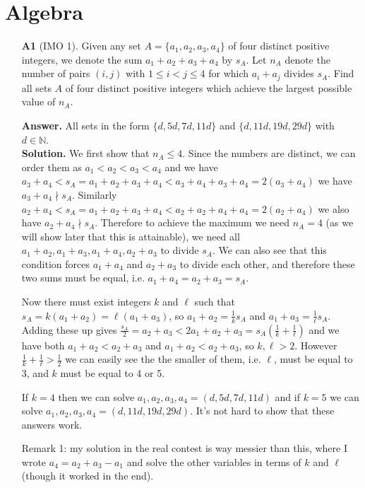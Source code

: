 \documentclass[11pt,a4paper]{article}
\begin{document}
\newcommand{\la}{\leftarrow}
\newcommand{\lra}{\leftrightarrow}
\newcommand{\bbN}{\mathbb{N}}
\newcommand{\dsum}{\displaystyle\sum}
\newcommand{\dprod}{\displaystyle\prod}

\newtheorem{lemma}{Lemma}


\section*{Algebra}
\begin{enumerate}
	\item [\textbf{A1}] (IMO 1). Given any set $A = \{a_1, a_2, a_3, a_4\}$ of four distinct positive integers, we denote the sum $a_1 +a_2 +a_3 +a_4$ by $s_A$. Let $n_A$ denote the number of pairs $(i, j)$ with $1 \leq  i < j \leq 4$ for which $a_i +a_j$ divides $s_A$. Find all sets $A$ of four distinct positive integers which achieve the largest possible value of $n_A$.
	
	\textbf{Answer.} All sets in the form $\{d, 5d, 7d, 11d\}$ and $\{d, 11d, 19d, 29d\}$ with $d\in\bbN$. \\
	\textbf{Solution.} We first show that $n_A\le 4$. Since the numbers are distinct, we can order them as $a_1<a_2<a_3<a_4$ and we have $a_3+a_4<s_A=a_1+a_2+a_3+a_4<a_3+a_4+a_3+a_4=2(a_3+a_4)$ we have $a_3+a_4\nmid s_A$. Similarly $a_2+a_4<s_A=a_1+a_2+a_3+a_4<a_2+a_2+a_4+a_4=2(a_2+a_4)$ we also have $a_2+a_4\nmid s_A$. 
	Therefore to achieve the maximum we need $n_A=4$ (as we will show later that this is attainable), we need all $a_1+a_2, a_1+a_3, a_1+a_4, a_2+a_3$ to divide $s_A$. We can also see that this condition forces $a_1+a_4$ and $a_2+a_3$ to divide each other, and therefore these two sums must be equal, i.e. $a_1+a_4=a_2+a_3=s_A$. 
	
	Now there must exist integers $k$ and $\ell$ such that $s_A=k(a_1+a_2)=\ell(a_1+a_3)$, so $a_1+a_2=\frac 1k s_A$ and $a_1+a_3=\frac 1{\ell} s_A$. Adding these up gives $\frac {s_A}{2}=a_2+a_3<2a_1+a_2+a_3=s_A(\frac 1k + \frac 1{\ell})$ and we have both $a_1+a_2<a_2+a_3$ and $a_1+a_2<a_2+a_3$, so $k, \ell>2$. However $\frac 1k + \frac 1{\ell}>\frac 12$ we can easily see the the smaller of them, i.e. $\ell$, must be equal to 3, and $k$ must be equal to 4 or 5. 
	
	If $k=4$ then we can solve $a_1, a_2, a_3, a_4=(d, 5d, 7d, 11d)$ and if $k=5$ we can solve $a_1, a_2, a_3, a_4=(d, 11d, 19d, 29d)$. It's not hard to show that these answers work. 
	
	Remark 1: my solution in the real contest is way messier than this, where I wrote $a_4=a_2+a_3-a_1$ and solve the other variables in terms of $k$ and $\ell$ (though it worked in the end). 
	

\end{enumerate}
\end{document}
